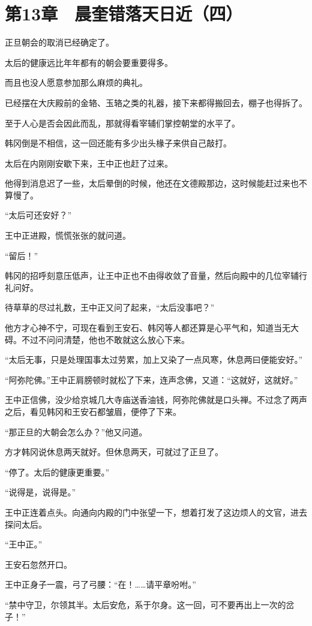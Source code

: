 \section{第13章　晨奎错落天日近（四）}

正旦朝会的取消已经确定了。

太后的健康远比年年都有的朝会要重要得多。

而且也没人愿意参加那么麻烦的典礼。

已经摆在大庆殿前的金辂、玉辂之类的礼器，接下来都得搬回去，棚子也得拆了。

至于人心是否会因此而乱，那就得看宰辅们掌控朝堂的水平了。

韩冈倒是不相信，这一回还能有多少出头椽子来供自己敲打。

太后在内刚刚安歇下来，王中正也赶了过来。

他得到消息迟了一些，太后晕倒的时候，他还在文德殿那边，这时候能赶过来也不算慢了。

“太后可还安好？”

王中正进殿，慌慌张张的就问道。

“留后！”

韩冈的招呼刻意压低声，让王中正也不由得收敛了音量，然后向殿中的几位宰辅行礼问好。

待草草的尽过礼数，王中正又问了起来，“太后没事吧？”

他方才心神不宁，可现在看到王安石、韩冈等人都还算是心平气和，知道当无大碍。不过不问问清楚，他也不敢就这么放心下来。

“太后无事，只是处理国事太过劳累，加上又染了一点风寒，休息两曰便能安好。”

“阿弥陀佛。”王中正肩膀顿时就松了下来，连声念佛，又道：“这就好，这就好。”

王中正信佛，没少给京城几大寺庙送香油钱，阿弥陀佛就是口头禅。不过念了两声之后，看见韩冈和王安石都皱眉，便停了下来。

“那正旦的大朝会怎么办？”他又问道。

方才韩冈说休息两天就好。但休息两天，可就过了正旦了。

“停了。太后的健康更重要。”

“说得是，说得是。”

王中正连着点头。向通向内殿的门中张望一下，想着打发了这边烦人的文官，进去探问太后。

“王中正。”

王安石忽然开口。

王中正身子一震，弓了弓腰：“在！……请平章吩咐。”

“禁中守卫，尔领其半。太后安危，系于尔身。这一回，可不要再出上一次的岔子！”

